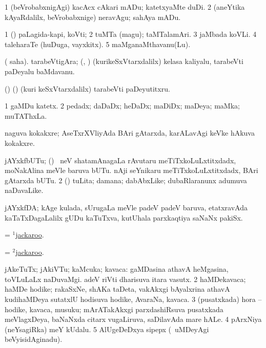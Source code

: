 \bentry
{}
\gl{\akirx}
\bmng
\bnum
\num{1} (beVrobabxnigAgi) kacAcx cAkari mADu; katetxyaMte duDi. 
\num{2} (aneYtika kAyaRdalilx, beVrobabxnige) neravAgu; sahAya mADu. 
\enum
\emng
\eentry

\bentry
{}
\gl{\nA}
\bmng
\bnum
\num{1} (\pArxparx) paLagida-kapi, koVti; 
\num{2} tuMTa (magu); taMTalamAri. 
\num{3} jaMbada koVLi. 
\num{4} taleharaTe (huDuga, vayxkitx). 
\num{5} maMganaMthavanu(Lu). 
\enum
\emng
\eentry

\bentry
{}
\gl{\nA}
\bmng
( saha). tarabeVtigAra; (\AseTxrXV, \AmA) (kurikeSxVtarxdalilx) kelasa kaliyalu, tarabeVti paDeyalu baMdavanu. 
\emng
\eentry

\bentry
{}
\gl{\akirx}
\bmng
(\AseTxrXV) (\AmA) (kuri keSxVtarxdalilx) tarabeVti paDeyutitxru. 
\emng
\eentry

\bentry
{}
\gl{\nA}
\bmng
\bnum
\num{1} gaMDu katetx. 
\num{2} pedadx; daDaDx; heDaDx; maDiDx; maDeya; maMka; muTAThxLa. 
\enum
\emng

\noindent
\gl{\pagu}
\bmng
{}  naguva kokakxre; AseTxrXVliyAda BAri gAtarxda, karALavAgi keVke hAkuva kokakxre. 
\emng
\eentry

\bentry
{}
\gl{\nA}
\bmng
\bnum
{} jAYxkfbUTu; 
\banum
{} (\birx) \kanmu\ neV shatamAnagaLa rAvutaru meTiTxkoLuLxtitxdadx, moNakAlina meVle baruva bUTu.  
 nAji seYnikaru meTiTxkoLuLxtitxdadx, BAri gAtarxda bUTu. 
\eanum
\numie
\num{2} (\rUpa) tuLita; damana; dabAbxLike; dubaRlaranunx adumuva naDavaLike. 
\enum
\emng
\eentry

\bentry
{}
\gl{\nA}
\bmng
jAYxkfDA; kAge kulada, sUrugaLa meVle padeV padeV baruva, etatxravAda kaTaTxDagaLalilx gUDu kaTuTxva, kutUhala parxkaqtiya saNaNx pakiSx. 
\emng
\eentry

\bentry
{}
\gl{\nA}
\bmng
=  \hyperlink{jackaroo(1)}{$^1$jackaroo}. 
\emng
\eentry

\bentry
{}
\gl{\akirx}
\bmng
=  \hyperlink{jackaroo(2)}{$^2$jackaroo}. 
\emng
\eentry

\bentry
{}
\gl{\nA}
\bmng
\bnum
{} jAkeTuTx; jAkiVTu; kaMcuka; kavaca: 
\banum
{} gaMDasina athavA heMgasina, toVLuLaLx naDuvaMgi. 
 adeV riVti dharisuva itara vasutx. 
\eanum
\numie
\num{2} haMDekavaca; haMDe hodike; rakaSxNe, shAKa taDeta, \mo vakAkxgi bAyalxrina athavA kudihaMDeya sutatxlU hodisuva hodike, AvaraNa, kavaca. 
\num{3} (pusatxkada) hora -- hodike, kavaca, musuku; mArATakAkxgi parxdashiRsuva pusatxkada meVlagxDeya, baNaNxda citarx \mo vugaLiruva, saDilavAda mare hALe. 
\num{4} pArxNiya (neYsagiRka) meY kUdalu. 
\num{5} AlUgeDeDxya sipepx (\kanmu\ uMDeyAgi beVyisidAginadu). 
\enum
\emng

